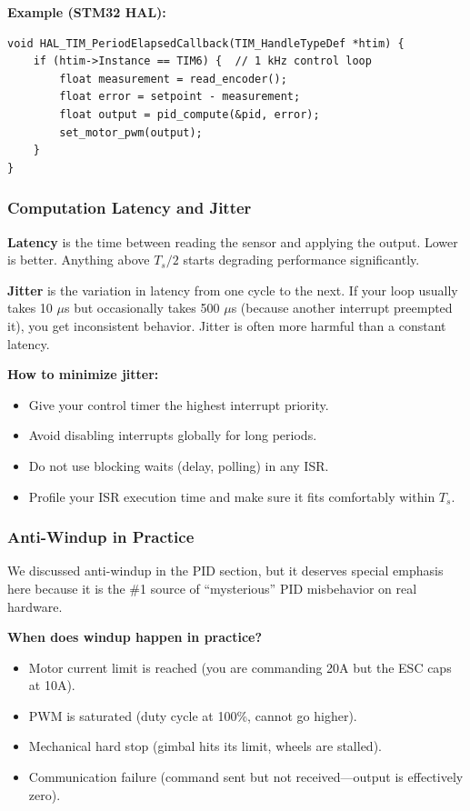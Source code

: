 \textbf{Example (STM32 HAL):}
\begin{verbatim}
void HAL_TIM_PeriodElapsedCallback(TIM_HandleTypeDef *htim) {
    if (htim->Instance == TIM6) {  // 1 kHz control loop
        float measurement = read_encoder();
        float error = setpoint - measurement;
        float output = pid_compute(&pid, error);
        set_motor_pwm(output);
    }
}
\end{verbatim}

\subsubsection{Computation Latency and Jitter}

\textbf{Latency} is the time between reading the sensor and applying the output. Lower is better. Anything above $T_s / 2$ starts degrading performance significantly.

\textbf{Jitter} is the variation in latency from one cycle to the next. If your loop usually takes 10 $\mu$s but occasionally takes 500 $\mu$s (because another interrupt preempted it), you get inconsistent behavior. Jitter is often more harmful than a constant latency.

\textbf{How to minimize jitter:}
\begin{itemize}
    \item Give your control timer the highest interrupt priority.
    \item Avoid disabling interrupts globally for long periods.
    \item Do not use blocking waits (delay, polling) in any ISR.
    \item Profile your ISR execution time and make sure it fits comfortably within $T_s$.
\end{itemize}

\subsubsection{Anti-Windup in Practice}

We discussed anti-windup in the PID section, but it deserves special emphasis here because it is the \#1 source of ``mysterious'' PID misbehavior on real hardware.

\textbf{When does windup happen in practice?}
\begin{itemize}
    \item Motor current limit is reached (you are commanding 20A but the ESC caps at 10A).
    \item PWM is saturated (duty cycle at 100\%, cannot go higher).
    \item Mechanical hard stop (gimbal hits its limit, wheels are stalled).
    \item Communication failure (command sent but not received---output is effectively zero).
\end{itemize}


